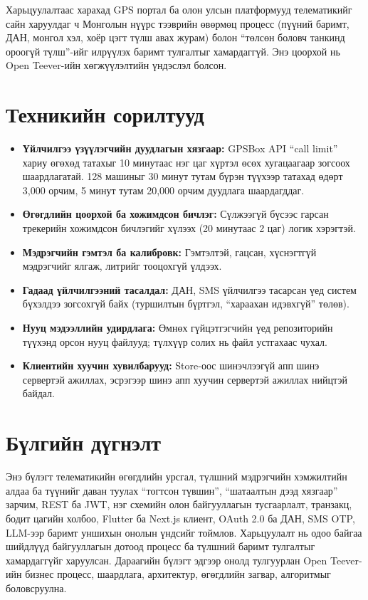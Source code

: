\documentclass[
12pt,
oneside,
english,
onehalfspacing,
nolistspacing,
headsepline,
]{MUST-Thesis}
\begin{document}
Харьцуулалтаас харахад GPS портал ба олон улсын платформууд телематикийг сайн харуулдаг ч Монголын нүүрс тээврийн өвөрмөц процесс (пүүний баримт, ДАН, монгол хэл, хоёр цэгт түлш авах журам) болон ``төлсөн боловч танкинд ороогүй түлш''-ийг илрүүлэх баримт тулгалтыг хамардаггүй. Энэ цоорхой нь Open Teever-ийн хөгжүүлэлтийн үндэслэл болсон.

\section{Техникийн сорилтууд}

\begin{itemize}
    \item \textbf{Үйлчилгээ үзүүлэгчийн дуудлагын хязгаар:} GPSBox API ``call limit'' хариу өгөхөд татахыг 10 минутаас нэг цаг хүртэл өсөх хугацаагаар зогсоох шаардлагатай. 128 машиныг 30 минут тутам бүрэн түүхээр татахад өдөрт 3,000 орчим, 5 минут тутам 20,000 орчим дуудлага шаардагддаг.
    \item \textbf{Өгөгдлийн цоорхой ба хожимдсон бичлэг:} Сүлжээгүй бүсээс гарсан трекерийн хожимдсон бичлэгийг хүлээх (20 минутаас 2 цаг) логик хэрэгтэй.
    \item \textbf{Мэдрэгчийн гэмтэл ба калибровк:} Гэмтэлтэй, гацсан, хүснэгтгүй мэдрэгчийг ялгаж, литрийг тооцохгүй үлдээх.
    \item \textbf{Гадаад үйлчилгээний тасалдал:} ДАН, SMS үйлчилгээ тасарсан үед систем бүхэлдээ зогсохгүй байх (туршилтын бүртгэл, ``хараахан идэвхгүй'' төлөв).
    \item \textbf{Нууц мэдээллийн удирдлага:} Өмнөх гүйцэтгэгчийн үед репозиторийн түүхэнд орсон нууц файлууд; түлхүүр солих нь файл устгахаас чухал.
    \item \textbf{Клиентийн хуучин хувилбарууд:} Store-оос шинэчлээгүй апп шинэ сервертэй ажиллах, эсрэгээр шинэ апп хуучин сервертэй ажиллах нийцтэй байдал.
\end{itemize}

\section{Бүлгийн дүгнэлт}

Энэ бүлэгт телематикийн өгөгдлийн урсгал, түлшний мэдрэгчийн хэмжилтийн алдаа ба түүнийг даван туулах ``тогтсон түвшин'', ``шатаалтын дээд хязгаар'' зарчим, REST ба JWT, нэг схемийн олон байгууллагын тусгаарлалт, транзакц, бодит цагийн холбоо, Flutter ба Next.js клиент, OAuth 2.0 ба ДАН, SMS OTP, LLM-ээр баримт уншихын онолын үндсийг тоймлов. Харьцуулалт нь одоо байгаа шийдлүүд байгууллагын дотоод процесс ба түлшний баримт тулгалтыг хамардаггүйг харуулсан. Дараагийн бүлэгт эдгээр онолд тулгуурлан Open Teever-ийн бизнес процесс, шаардлага, архитектур, өгөгдлийн загвар, алгоритмыг боловсруулна.
\end{document}

